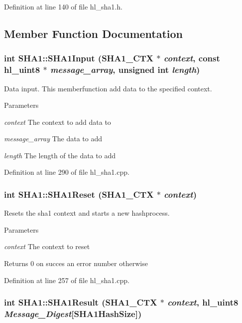 Definition at line 140 of file hl\_\-sha1.h.

\subsection{Member Function Documentation}
\hypertarget{class_s_h_a1_ab4e33d976b42b7b9df3fa31f17a374ad}{
\subsubsection[{SHA1Input}]{\setlength{\rightskip}{0pt plus 5cm}int SHA1::SHA1Input ({\bf SHA1\_\-CTX} $\ast$ {\em context}, \/  const {\bf hl\_\-uint8} $\ast$ {\em message\_\-array}, \/  unsigned int {\em length})}}
\label{class_s_h_a1_ab4e33d976b42b7b9df3fa31f17a374ad}


Data input. This memberfunction add data to the specified context.


\begin{DoxyParams}{Parameters}
\item[{\em context}]The context to add data to \item[{\em message\_\-array}]The data to add \item[{\em length}]The length of the data to add \end{DoxyParams}


Definition at line 290 of file hl\_\-sha1.cpp.\hypertarget{class_s_h_a1_a03a92bcc340163fc0cff4050fa51619f}{
\subsubsection[{SHA1Reset}]{\setlength{\rightskip}{0pt plus 5cm}int SHA1::SHA1Reset ({\bf SHA1\_\-CTX} $\ast$ {\em context})}}
\label{class_s_h_a1_a03a92bcc340163fc0cff4050fa51619f}


Resets the sha1 context and starts a new hashprocess. 
\begin{DoxyParams}{Parameters}
\item[{\em context}]The context to reset \end{DoxyParams}
\begin{DoxyReturn}{Returns}
0 on succes an error number otherwise 
\end{DoxyReturn}


Definition at line 257 of file hl\_\-sha1.cpp.\hypertarget{class_s_h_a1_a0d036511ed4730fc4b575b57efc8cacf}{
\subsubsection[{SHA1Result}]{\setlength{\rightskip}{0pt plus 5cm}int SHA1::SHA1Result ({\bf SHA1\_\-CTX} $\ast$ {\em context}, \/  {\bf hl\_\-uint8} {\em Message\_\-Digest}\mbox{[}SHA1HashSize\mbox{]})}}
\label{class_s_h_a1_a0d036511ed4730fc4b575b57efc8cacf}


